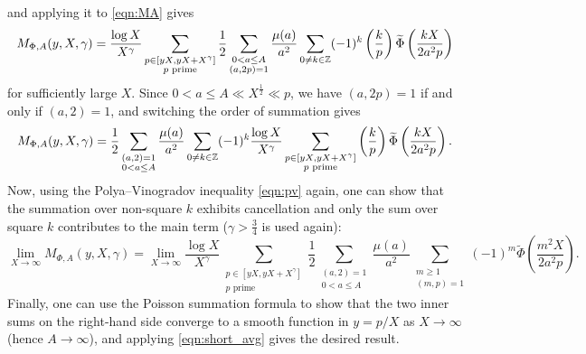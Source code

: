 and applying it to \eqref{eqn:MA} gives
\[
M_{\Phi, A}(y, X, \gamma) = \frac{\log X}{X^\gamma} \sum_{\substack{p \in [yX, yX + X^\gamma] \\ p \text{ prime}}} \frac{1}{2} \sum_{\substack{0 < a \le A \\ (a, 2p) = 1}} \frac{\mu(a)}{a^2} \sum_{0 \ne k \in \mathbb{Z}} (-1)^k \left(\frac{k}{p}\right) \widetilde{\Phi} \left(\frac{k X}{2 a^2 p}\right)
\]
for sufficiently large $X$.
Since $0 < a \le A \ll X^{\frac{1}{2}} \ll p$, we have $(a, 2p) = 1$ if and only if $(a, 2) = 1$, and switching the order of summation gives
\[
M_{\Phi, A}(y, X, \gamma) = \frac{1}{2} \sum_{\substack{(a,2) = 1 \\ 0 < a \le A}} \frac{\mu(a)}{a^2} \sum_{0 \ne k \in \mathbb{Z}} (-1)^k \frac{\log X}{X^\gamma} \sum_{\substack{p \in [yX, yX + X^\gamma] \\ p \text{ prime}}} \left(\frac{k}{p}\right) \widetilde{\Phi} \left(\frac{k X}{2 a^2 p}\right).
\]
Now, using the Polya--Vinogradov inequality \eqref{eqn:pv} again, one can show that the summation over non-square $k$ exhibits cancellation and only the sum over square $k$ contributes to the main term ($\gamma > \frac{3}{4}$ is used again):
\[
\lim_{X \to \infty} M_{\Phi, A}(y, X, \gamma) = \lim_{X \to \infty} \frac{\log X}{X^\gamma} \sum_{\substack{p \in [yX, yX + X^\gamma] \\ p \text{ prime}}} \frac{1}{2} \sum_{\substack{(a,2) = 1 \\ 0 < a \le A}} \frac{\mu(a)}{a^2} \sum_{\substack{m \ge 1 \\ (m, p) = 1}} (-1)^m \widetilde{\Phi} \left(\frac{m^2 X}{2 a^2 p}\right).
\]
Finally, one can use the Poisson summation formula to show that the two inner sums on the right-hand side converge to a smooth function in $y = p / X$ as $X \to \infty$ (hence $A \to \infty$), and applying \eqref{eqn:short_avg} gives the desired result.


